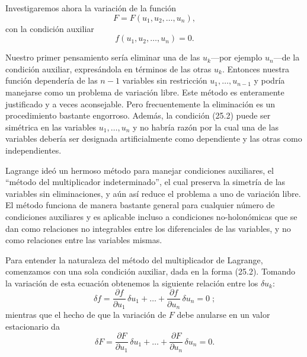 \documentclass[12pt,a4paper]{book}
\begin{document}
Investigaremos ahora la variación de la función
\begin{equation}
F = F(u_1, u_2, \ldots, u_n), \tag{25.1}
\end{equation}
con la condición auxiliar
\begin{equation}
f(u_1, u_2, \ldots, u_n) = 0. \tag{25.2}
\end{equation}

Nuestro primer pensamiento sería eliminar una de las $u_k$---por ejemplo $u_n$---de la condición auxiliar, expresándola en términos de las otras $u_k$. Entonces nuestra función dependería de las $n-1$ variables sin restricción $u_1, \ldots, u_{n-1}$ y podría manejarse como un problema de variación libre. Este método es enteramente justificado y a veces aconsejable. Pero frecuentemente la eliminación es un procedimiento bastante engorroso. Además, la condición (25.2) puede ser simétrica en las variables $u_1, \ldots, u_n$ y no habría razón por la cual una de las variables debería ser designada artificialmente como dependiente y las otras como independientes.

Lagrange ideó un hermoso método para manejar condiciones auxiliares, el ``método del multiplicador indeterminado'', el cual preserva la simetría de las variables sin eliminaciones, y aún así reduce el problema a uno de variación libre. El método funciona de manera bastante general para cualquier número de condiciones auxiliares y es aplicable incluso a condiciones no-holonómicas que se dan como relaciones no integrables entre los diferenciales de las variables, y no como relaciones entre las variables mismas.

Para entender la naturaleza del método del multiplicador de Lagrange, comenzamos con una sola condición auxiliar, dada en la forma (25.2). Tomando la variación de esta ecuación obtenemos la siguiente relación entre los $\delta u_k$:
\begin{equation}
\delta f = \frac{\partial f}{\partial u_1} \, \delta u_1 + \ldots + \frac{\partial f}{\partial u_n} \, \delta u_n = 0 \; ; \tag{25.3}
\end{equation}
mientras que el hecho de que la variación de $F$ debe anularse en un valor estacionario da
\begin{equation}
\delta F = \frac{\partial F}{\partial u_1} \, \delta u_1 + \ldots + \frac{\partial F}{\partial u_n} \, \delta u_n = 0. \tag{25.4}
\end{equation}
\end{document}
